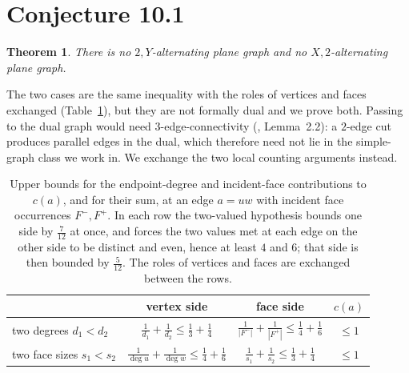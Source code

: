 \documentclass{baustms}
\theoremstyle{cupthm}
\newtheorem{theorem}{Theorem}[section]
\theoremstyle{cupdefn}
\theoremstyle{cuprem}
\begin{document}
\section{Conjecture 10.1}\label{sec:101}

\begin{theorem}\label{thm:101}
There is no $2,Y$-alternating plane graph and no $X,2$-alternating plane graph.
\end{theorem}

The two cases are the same inequality with the roles of vertices and faces
exchanged (Table~\ref{tab:budget}), but they are not formally dual and we prove
both. Passing to the dual
graph would need $3$-edge-connectivity (\cite{AHSSV2015}, Lemma~2.2): a
$2$-edge cut produces parallel edges in the dual, which therefore need not lie in
the simple-graph class we work in. We exchange the two local counting arguments
instead.

\begin{table}[ht]
\centering
\begin{tabular}{lccc}
\toprule
 & vertex side & face side & $c(a)$ \\
\midrule
two degrees $d_1<d_2$
 & $\tfrac1{d_1}+\tfrac1{d_2} \le \tfrac13+\tfrac14$
 & $\tfrac1{|F^-|}+\tfrac1{|F^+|} \le \tfrac14+\tfrac16$
 & $\le 1$ \\[2pt]
two face sizes $s_1<s_2$
 & $\tfrac1{\deg u}+\tfrac1{\deg w} \le \tfrac14+\tfrac16$
 & $\tfrac1{s_1}+\tfrac1{s_2} \le \tfrac13+\tfrac14$
 & $\le 1$ \\
\bottomrule
\end{tabular}
\caption{Upper bounds for the endpoint-degree and incident-face contributions to
$c(a)$, and for their sum, at an edge $a=uw$ with incident face occurrences
$F^-,F^+$. In each row the two-valued hypothesis bounds one side by
$\tfrac7{12}$ at once, and forces the two values met at each edge on the other
side to be distinct and even, hence at least $4$ and $6$; that side is then
bounded by $\tfrac5{12}$. The roles of vertices and faces are exchanged between
the rows.}\label{tab:budget}
\end{table}
\end{document}
